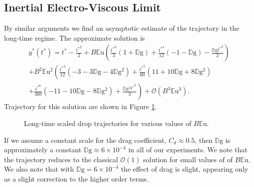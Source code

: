\documentclass[12pt,a4paper,oneside]{book}
\begin{document}
\subsection{Inertial Electro-Viscous Limit}
By similar arguments we find an asymptotic estimate of the trajectory in the long-time regime. The approximate solution is 
\begin{eqnarray*}
\label{perturb_viscous}
&{y^*}({t^*}) = {t^*} - \frac{{t^*}^{2}}{2} + B\mathbb{E}\mbox{u} \left(\frac{{t^*}^{3}}{3} \left(1 + \mathbb{D}\mbox{g}\right) + \frac{{t^*}^{4}}{12} \left(-1 - \mathbb{D}\mbox{g}\right) - \frac{\mathbb{D}\mbox{g} {t^*}^{2}}{2}\right)&  \\
&+ B^2\mathbb{E}\mbox{u}^{2} \left(\frac{{t^*}^{4}}{12} \left(-3 - 3 \mathbb{D}\mbox{g} - 4 \mathbb{D}\mbox{g}^{2}\right) + \frac{{t^*}^{5}}{60} \left(11 + 10 \mathbb{D}\mbox{g} + 8 \mathbb{D}\mbox{g}^{2}\right) \right. & \\
&\left. + \frac{{t^*}^{6}}{360} \left(-11 - 10 \mathbb{D}\mbox{g} - 8 \mathbb{D}\mbox{g}^{2}\right) + \frac{\mathbb{D}\mbox{g}^{2} {t^*}^{3}}{3}\right)
 + \mathcal{O}(B^3\mathbb{E}\mbox{u}^3).& \nonumber
\end{eqnarray*}
Trajectory for this solution are shown in Figure \ref{fig:long_times}.
\begin{figure}[htb]
    \centering
    
    \caption{Long-time scaled drop trajectories for various values of $B \mathbb{E}\mbox{u}$.}
     \label{fig:long_times}
\end{figure}
If we assume a constant scale for the drag coefficient, $C_d \approx 0.5$, then $\mathbb{D}\mbox{g}$ is approximately a constant $\mathbb{D}\mbox{g} \approx 6 \times 10^{-4}$ in all of our experiments. We note that the trajectory reduces to the classical $\mathcal{O}(1)$ solution for small values of of $B \mathbb{E}\mbox{u}$. We also note that with $\mathbb{D}\mbox{g} = 6 \times 10^{-4}$ the effect of drag is slight, appearing only as a slight correction to the higher order terms.
 
\end{document}
